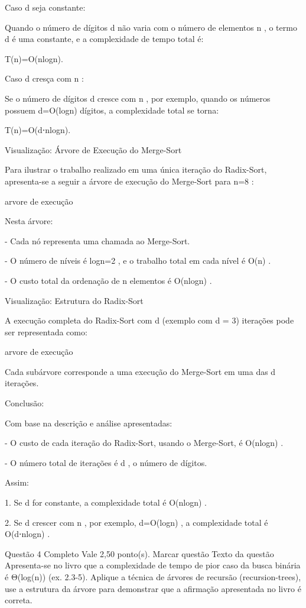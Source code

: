 Caso d
 seja constante:

Quando o número de dígitos d
 não varia com o número de elementos n
, o termo d
 é uma constante, e a complexidade de tempo total é:

T(n)=O(nlogn).



Caso d
 cresça com n
:

Se o número de dígitos d
 cresce com n
, por exemplo, quando os números possuem d=O(logn)
 dígitos, a complexidade total se torna:

T(n)=O(d⋅nlogn).



Visualização: Árvore de Execução do Merge-Sort

Para ilustrar o trabalho realizado em uma única iteração do Radix-Sort, apresenta-se a seguir a árvore de execução do Merge-Sort para n=8
:

arvore de execução

Nesta árvore:

- Cada nó representa uma chamada ao Merge-Sort.

- O número de níveis é logn=2
, e o trabalho total em cada nível é O(n)
.

- O custo total da ordenação de n
 elementos é O(nlogn)
.



Visualização: Estrutura do Radix-Sort

A execução completa do Radix-Sort com d
 (exemplo com d = 3) iterações pode ser representada como:

arvore de execução

Cada subárvore corresponde a uma execução do Merge-Sort em uma das d
 iterações.



Conclusão:

Com base na descrição e análise apresentadas:

- O custo de cada iteração do Radix-Sort, usando o Merge-Sort, é O(nlogn)
.

- O número total de iterações é d
, o número de dígitos.



Assim:

1. Se d
 for constante, a complexidade total é O(nlogn)
.

2. Se d
 crescer com n
, por exemplo, d=O(logn)
, a complexidade total é O(d⋅nlogn)
.

Questão 4
Completo
Vale 2,50 ponto(s).
Marcar questão
Texto da questão
Apresenta-se no livro que a complexidade de tempo de pior caso da busca binária é Θ(log(n))
 (ex. 2.3-5). Aplique a técnica de árvores de recursão (recursion-trees), use a estrutura da árvore para demonstrar que a afirmação apresentada no livro é correta.



